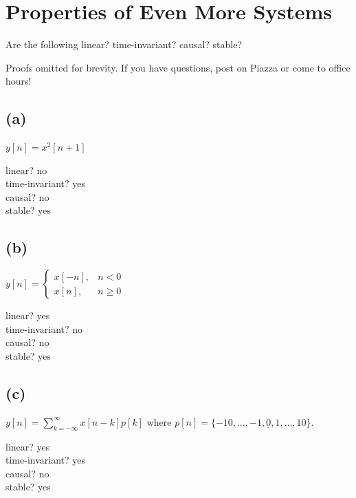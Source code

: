 \documentclass[11pt]{article}
\begin{document}
\section{Properties of Even More Systems}
Are the following linear? time-invariant? causal? stable?


{\color{blue} 
Proofs omitted for brevity. If you have questions, post on Piazza or come to office hours!
}

\subsection*{(a)}

$y[n] = x^2[n+1]$

{\color{blue}
linear? no \\
time-invariant? yes \\
causal? no \\
stable? yes \\
}

\subsection*{(b)}

$y[n]=\begin{cases}x[-n], & n < 0\\ x[n], & n \geq 0 \end{cases} $

{\color{blue}
linear? yes \\
time-invariant? no \\
causal? no \\
stable? yes \\
}

\subsection*{(c)}

$y[n] = \sum_{k=-\infty}^{\infty}x[n-k]p[k]$ where $p[n] = \{-10,\ldots,-1,\underline{0},1,\ldots,10\}$.

{\color{blue}
linear? yes \\
time-invariant? yes \\
causal? no \\
stable? yes \\
}

\end{document}

